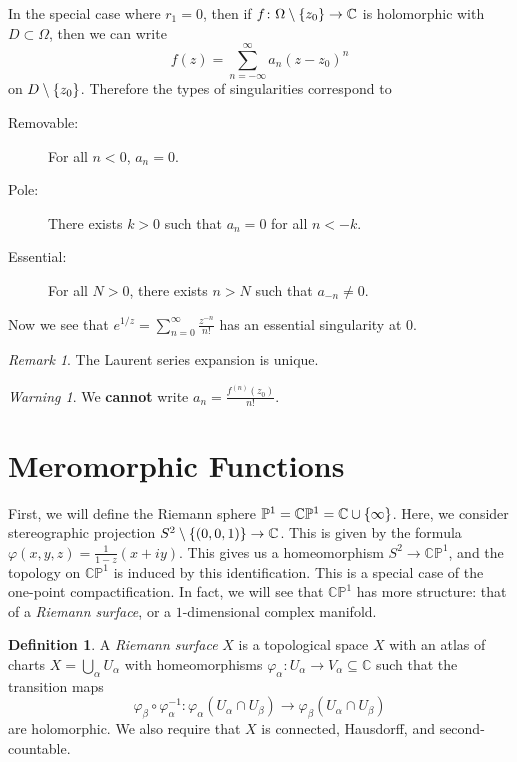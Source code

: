 \documentclass[leqno, openany]{memoir}
\theoremstyle{definition}
\newtheorem{defn}[thm]{Definition}
\theoremstyle{remark}
\newtheorem{rmk}[thm]{Remark}
\newtheorem{warn}[thm]{Warning}
\theoremstyle{plain}
\theoremstyle{definition}
\theoremstyle{remark}
\newcommand{\C}{\mathbb{C}}
\renewcommand{\P}{\mathbb{P}}
\begin{document}
In the special case where $r_1 = 0$, then if $f \colon \Omega \setminus
\qty{z_0} \to \C$ is holomorphic with $D \subset \Omega$, then we can write \[
f(z) = \sum_{n=-\infty}^{\infty} a_n {(z-z_0)}^n \] on $D \setminus \qty{z_0}$.
Therefore the types of singularities correspond to \begin{description}
    \item[Removable:] For all $n < 0$, $a_n = 0$.  \item[Pole:] There exists $k
        > 0$ such that $a_n = 0$ for all $n < -k$.  \item[Essential:] For all
        $N > 0$, there exists $n > N$ such that $a_{-n} \neq 0$.
\end{description} Now we see that $e^{1/z} = \sum_{n=0}^{\infty}
\frac{z^{-n}}{n!}$ has an essential singularity at $0$.

\begin{rmk} The Laurent series expansion is unique.  \end{rmk}

\begin{warn} We \textbf{cannot} write $a_n = \frac{f^{(n)}(z_0)}{n!}$.
\end{warn}

\section{Meromorphic Functions}%

First, we will define the Riemann sphere $\P^1 = \C\P^1 = \C \cup
\qty{\infty}$. Here, we consider stereographic projection $S^2 \setminus
\qty{(0,0,1)} \to \C$. This is given by the formula $\varphi(x,y,z) =
\frac{1}{1-z} (x+iy)$. This gives us a homeomorphism $S^2 \to \C\P^1$, and the
topology on $\C\P^1$ is induced by this identification. This is a special case
of the one-point compactification. In fact, we will see that $\C\P^1$ has more
structure: that of a \textit{Riemann surface}, or a $1$-dimensional complex
manifold.

\begin{defn} A \textit{Riemann surface} $X$ is a topological space $X$ with an
    atlas of charts $X = \bigcup_{\alpha} U_{\alpha}$ with homeomorphisms
    $\varphi_{\alpha} \colon U_{\alpha} \to V_{\alpha} \subseteq \C$ such that
    the transition maps \[ \varphi_{\beta} \circ \varphi_{\alpha}^{-1} \colon
    \varphi_{\alpha}(U_{\alpha} \cap U_{\beta}) \to \varphi_{\beta}(U_{\alpha}
\cap U_{\beta}) \] are holomorphic. We also require that $X$ is connected,
Hausdorff, and second-countable.  \end{defn}
\end{document}
